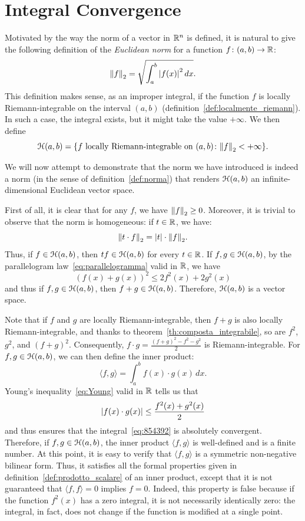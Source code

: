 \section{Integral Convergence}
\label{sec:convergenza_integrale}

Motivated by the way the norm of a vector in ${\mathbb R}^n$ is defined, it is natural
to give the following definition of the \emph{Euclidean norm} for a function
$f\colon (a,b)\to {\mathbb R}$:
\[
  {\left\Vert f\right\Vert}_2 = \sqrt{\int_a^b {\left|f(x)\right|}^2\, dx}.
\]
This definition makes sense, as an improper integral, if the function $f$ is
locally Riemann-integrable on the interval $(a,b)$
(definition~\ref{def:localmente_riemann}). In such a case, the integral exists,
but it might take the value $+\infty$. We then define
\[
\mathcal H(a,b) =
{\left\{ \text{$f$ locally Riemann-integrable on $(a,b)$}\colon {\left\Vert  f\right\Vert}_2< +\infty \right\}}.
\]

We will now attempt to demonstrate that the norm we have introduced is indeed a
norm (in the sense of definition~\ref{def:norma}) that renders $\mathcal H(a,b)$ an
infinite-dimensional Euclidean vector space.

First of all, it is clear that for any $f$, we have ${\left\Vert  f\right\Vert}_2\ge 0$. Moreover,
it is trivial to observe that the norm is homogeneous: if $t\in {\mathbb R}$, we have:
\[
  {\left\Vert t\cdot f\right\Vert}_2= {\left|t\right|}\cdot {\left\Vert f\right\Vert}_2.
\]
Thus, if $f\in \mathcal H(a,b)$, then $t f\in \mathcal H(a,b)$ for every $t \in {\mathbb R}$. If $f,g\in
\mathcal H(a,b)$, by the parallelogram law~\eqref{eq:parallelogramma} valid in ${\mathbb R}$, we
have
\[
  (f(x) + g(x))^2 \le 2f^2(x) + 2 g^2(x)
\]
and thus if $f,g \in \mathcal H(a,b)$, then $f+g\in \mathcal H(a,b)$. Therefore, $\mathcal H(a,b)$ is a
vector space.

Note that if $f$ and $g$ are locally Riemann-integrable, then $f+g$ is also
locally Riemann-integrable, and thanks to theorem~\ref{th:composta_integrabile},
so are $f^2$, $g^2$, and $(f+g)^2$. Consequently, $f\cdot g =
\frac{(f+g)^2-f^2-g^2}{2}$ is Riemann-integrable. For $f,g\in \mathcal H(a,b)$, we can
then define the inner product:
\begin{equation}\label{eq:854392}
  \langle f, g\rangle = \int_a^b f(x) \cdot g(x)\, dx.
\end{equation}
Young's inequality~\eqref{eq:Young} valid in ${\mathbb R}$ tells us that
\[
  {\left|f(x) \cdot g(x)\right|} \le \frac{f^2(x)+g^2(x)}{2}
\]
and thus ensures that the integral~\eqref{eq:854392} is absolutely convergent.
Therefore, if $f,g\in \mathcal H(a,b)$, the inner product $\langle f,g\rangle$ is
well-defined and is a finite number. At this point, it is easy to verify that
$\langle f,g\rangle$ is a symmetric non-negative bilinear form. Thus, it
satisfies all the formal properties given in
definition~\ref{def:prodotto_scalare} of an inner product, except that it is not
guaranteed that $\langle f,f\rangle = 0$ implies $f=0$. Indeed, this property is
false because if the function $f^2(x)$ has a zero integral, it is not
necessarily identically zero: the integral, in fact, does not change if the
function is modified at a single point.

